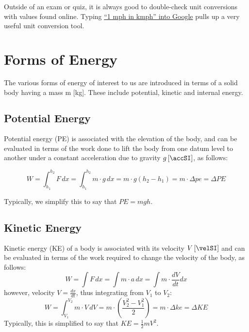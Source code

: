 Outside of an exam or quiz, it is always good to double-check unit conversions with values found online.  Typing \href{https://www.google.com/search?q=1+mph+in+kmph}{``1 mph in kmph'' into Google} pulls up a very useful unit conversion tool.

\section{Forms of Energy} \label{sec:ch1_energyForms}
The various forms of energy of interest to us are introduced in terms of a solid body having a mass m [kg]. These include potential, kinetic and internal energy.

\subsection{Potential Energy}
Potential energy (PE) is associated with the elevation of the body, and can be evaluated in terms of the work done to lift the body from one datum level to another under a constant acceleration due to gravity $g\left[\accSI\right]$, as follows:

\begin{equation}
  W=\int_{h_1}^{h_2}F\,dx=\int_{h_1}^{h_2}m\cdot g\,dx=m\cdot g(h_2-h_1)=m\cdot\Delta pe=\Delta PE
\end{equation}

Typically, we simplify this to say that $PE = mgh$.

\subsection{Kinetic Energy}
Kinetic energy (KE) of a body is associated with its velocity $V\left[\velSI\right]$ and can be evaluated in terms of the work required to change the velocity of the body, as follows:
\begin{equation}
  W=\int F\,dx=\int m\cdot a \,dx=\int m\cdot\frac{dV}{dt}dx
\end{equation}
however, velocity $V=\frac{dx}{dt}$, thus integrating from $V_1$ to $V_2$:
\begin{equation}
  W=\int_{V_1}^{V_2}m\cdot V\,dV=m\cdot\left(\frac{V_2^2-V_1^2}{2}\right)=m\cdot\Delta ke=\Delta KE
\end{equation}
Typically, this is simplified to say that $KE = \frac{1}{2} m V^2$.

